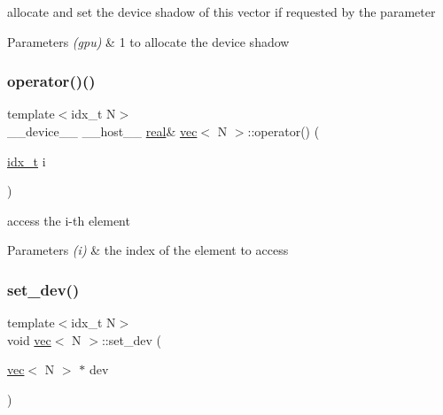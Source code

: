 allocate and set the device shadow of this vector if requested by the parameter 


\begin{DoxyParams}{Parameters}
{\em (gpu)} & 1 to allocate the device shadow \\
\hline
\end{DoxyParams}
\mbox{\label{structvec_ad73089ab6c3f3fae0b233bb16920ce5d}} 
\subsubsection{\texorpdfstring{operator()()}{operator()()}}
{\footnotesize\ttfamily template$<$idx\+\_\+t N$>$ \\
\+\_\+\+\_\+device\+\_\+\+\_\+ \+\_\+\+\_\+host\+\_\+\+\_\+ \hyperlink{vgg__util_8h_a1082d08aaa761215ec83e7149f27ad16}{real}\& \hyperlink{structvec}{vec}$<$ N $>$\+::operator() (\begin{DoxyParamCaption}\item[{\hyperlink{vgg__util_8h_a8e93478a00e685bea5e6a3f617bf03a3}{idx\+\_\+t}}]{i }\end{DoxyParamCaption})\hspace{0.3cm}{\ttfamily [inline]}}



access the i-\/th element 


\begin{DoxyParams}{Parameters}
{\em (i)} & the index of the element to access \\
\hline
\end{DoxyParams}
\mbox{\label{structvec_a7f8e5821a38f3ef76ed82a165e142774}} 
\subsubsection{\texorpdfstring{set\+\_\+dev()}{set\_dev()}}
{\footnotesize\ttfamily template$<$idx\+\_\+t N$>$ \\
void \hyperlink{structvec}{vec}$<$ N $>$\+::set\+\_\+dev (\begin{DoxyParamCaption}\item[{\hyperlink{structvec}{vec}$<$ N $>$ $\ast$}]{dev }\end{DoxyParamCaption})\hspace{0.3cm}{\ttfamily [inline]}}



